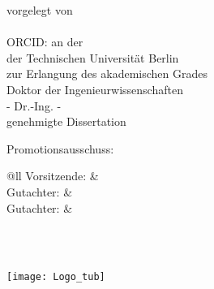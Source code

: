 {{\begin{titlepage}
\begin{center}
				\vfill
				\huge\textbf{\mytitle}
				\vfill
				\Large vorgelegt von\\
				\autor\\
				ORCID: \orcid
				\vfill
				an der \myfaculty \\
				der Technischen Universität Berlin\\
				zur Erlangung des akademischen Grades\\
				\vspace{0.5cm}
				Doktor der Ingenieurwissenschaften\\
				- Dr.-Ing. -\\
				\vspace{0.5cm}
				genehmigte Dissertation
			\end{center}
			\vfill
			\normalsize
			Promotionsausschuss:\\[2ex]
			\begin{tabular}{@{}ll}
			Vorsitzende: & \chairman \\
			Gutachter: & \firstreviewer \\
			Gutachter: & \secondreviewer \\
			\\[3ex]
			\end{tabular}
			\vfill
			\centering
			\myplace\ \the\year		
		\end{titlepage}
		}{
		\begin{titlepage}
			\begin{center}
				\begin{minipage}{0.2\textwidth}
					\centering
					\vfill	
					\texttt{[image: Logo\_tub]}
					\vfill
				\end{minipage}
				\hfill
				\begin{minipage}{0.7\textwidth}
					\begin{flushright}
						\vfill

\end{flushright}
\end{minipage}
\end{center}
\end{titlepage}}}
